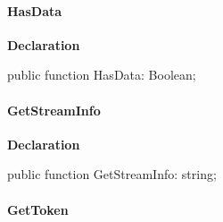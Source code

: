 \documentclass{report}
\newif\ifpdf
\begin{document}
\paragraph*{HasData}\hspace*{\fill}

\label{PasDoc_Tokenizer.TTokenizer-HasData}
\begin{list}{}{
\setlength{\itemindent}{0cm}
\setlength{\listparindent}{0cm}
\setlength{\leftmargin}{\evensidemargin}
\addtolength{\leftmargin}{\tmplength}
\settowidth{\labelsep}{X}
\addtolength{\leftmargin}{\labelsep}
\setlength{\labelwidth}{\tmplength}
}
\item[\textbf{Declaration}\hfill]
\ifpdf
\begin{flushleft}
\fi
\begin{ttfamily}
public function HasData: Boolean;\end{ttfamily}

\ifpdf
\end{flushleft}
\fi

\end{list}
\paragraph*{GetStreamInfo}\hspace*{\fill}

\label{PasDoc_Tokenizer.TTokenizer-GetStreamInfo}
\begin{list}{}{
\setlength{\itemindent}{0cm}
\setlength{\listparindent}{0cm}
\setlength{\leftmargin}{\evensidemargin}
\addtolength{\leftmargin}{\tmplength}
\settowidth{\labelsep}{X}
\addtolength{\leftmargin}{\labelsep}
\setlength{\labelwidth}{\tmplength}
}
\item[\textbf{Declaration}\hfill]
\ifpdf
\begin{flushleft}
\fi
\begin{ttfamily}
public function GetStreamInfo: string;\end{ttfamily}

\ifpdf
\end{flushleft}
\fi

\end{list}
\paragraph*{GetToken}\hspace*{\fill}
\end{document}
